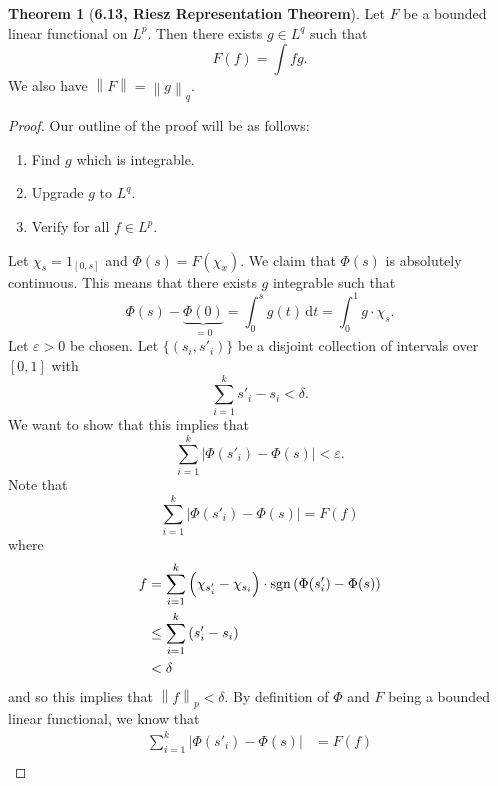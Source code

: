 \documentclass[12pt]{article}
\def\sgn{\mathop{\rm sgn}\nolimits}
\newcommand{\dif}{\, \mathrm{d}}
\newcommand{\norm}[1]{\left\lVert #1 \right\rVert}
\newcommand{\abs}[1]{\left\lvert #1 \right\rvert}
\renewcommand{\epsilon}{\varepsilon}
\theoremstyle{definition}
\newtheorem*{thm}{Theorem}
\begin{document}
\begin{thm}[\textbf{6.13, Riesz Representation Theorem}]

    Let \( F \) be a bounded linear functional on \( L^p \). 
    Then there exists \( g \in L^q \) such that 
        \[  
            F(f) = \int fg. 
        \]
    We also have \( \norm{F} = \norm{g}_q \).

        \begin{proof}
            Our outline of the proof will be as follows:
                \begin{enumerate}[label = Step \Roman{*}:]
                    \item Find \( g \) which is integrable.
                    \item Upgrade \( g \) to \( L^q \). 
                    \item Verify for all \( f \in L^ p\).
                \end{enumerate}
            Let \( \chi_s = 1_{[0,s]} \) and \( \Phi(s) = F(\chi_x) \).
            We claim that \( \Phi(s) \) is absolutely continuous. 
            This means that there exists \( g \) integrable such that  
                \[ 
                    \Phi(s) - \underbrace{\Phi(0)}_{=0} = \int_{0}^{s} g(t) \dif t = \int_{0}^{1} g \cdot \chi_{s}.
                \]
            Let \( \epsilon > 0 \) be chosen. Let \( \{ (s_i, s'_{i}) \} \) be a disjoint collection of intervals over \( [0, 1] \) with 
                \[
                    \sum_{i=1}^{k} s'_{i} - s_{i} < \delta.    
                \]
            We want to show that this implies that
                \[  
                    \sum_{i=1}^{k} \abs{ \Phi(s'_{i}) - \Phi(s)} < \epsilon.
                \]
            Note that 
                \[
                    \sum_{i=1}^{k}  \abs{ \Phi(s'_{i}) - \Phi(s)} = F(f)
                \]
            where
                \begin{align*}
                    f &= \sum_{i=1}^{k} \left( \chi_{s'_{i}} - \chi_{s_{i}}\right) \cdot \sgn\left( \Phi(s'_{i}) - \Phi(s)  \right) \\
                    &\leq \sum_{i=1}^{k} \left( s'_{i} - s_{i} \right)  \\
                    &< \delta
                \end{align*}
            and so this implies that \( \norm{f}_{p} < \delta \).
            By definition of \( \Phi \) and \( F \) being a bounded linear functional, we know that 
                \begin{align*}
                    \sum_{i=1}^{k} \abs{ \Phi(s'_{i}) - \Phi(s)} &= F(f) \\

\end{align*}
\end{proof}
\end{thm}
\end{document}
